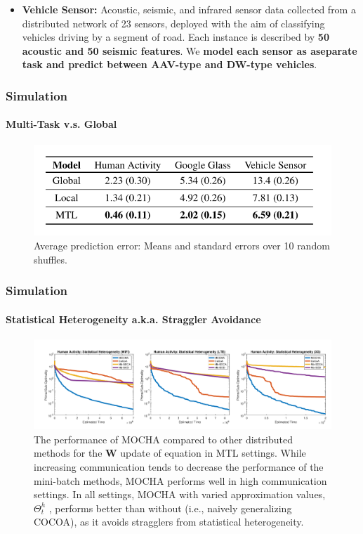 \documentclass[UTF8,aspectratio=169,presentation]{ctexbeamer}
\begin{document}
\begin{frame}[t]
  \begin{itemize}
    \item \textbf{Vehicle Sensor:} Acoustic, seismic, and infrared sensor data collected from a distributed network of 23 sensors, deployed with the aim of classifying vehicles driving by a segment of road. Each instance is described by \textbf{50 acoustic and 50 seismic features}.  We \textbf{model each sensor as aseparate task and predict between AAV-type and DW-type vehicles}.
  \end{itemize}
  
\end{frame}

\renewcommand{\figurename}{Figure}

\begin{frame}[t]
  \frametitle{Simulation}
  \framesubtitle{Multi-Task v.s. Global}
  \begin{figure}[htpb]
    \centering
    \includegraphics[width=0.8\linewidth]{images/mtl-result.png}
    \caption{Average prediction error: Means and standard errors over 10 random shuffles.}%
    \label{fig:1}
  \end{figure}

\end{frame}

\begin{frame}[t]
  \frametitle{Simulation}
  \framesubtitle{Statistical Heterogeneity a.k.a. Straggler Avoidance}
  \begin{figure}[htpb]
    \centering
    \includegraphics[width=0.8\linewidth]{images/statistical.png}
    \caption{The performance of MOCHA compared to other distributed methods for the $\mathbf W$ update of equation in MTL settings. While
increasing communication tends to decrease the performance of the mini-batch methods, MOCHA performs well
in high communication settings. In all settings, MOCHA with varied approximation values, $Θ^h_t$ , performs better than without (i.e., naively generalizing COCOA), as it avoids stragglers from statistical heterogeneity.}%
    \label{fig:2}
  \end{figure}
\end{frame}
\end{document}
